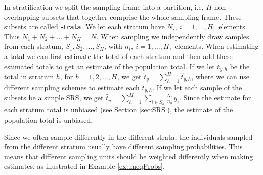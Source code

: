 \documentclass{article}
\begin{document}
In stratification we split the sampling frame into a partition, i.e, \(H\) non-
overlapping subsets that together comprise the whole sampling frame. These
subsets are called \textbf{strata}. We let each stratum have \(N_i,\ i = 1, \dots
, H,\) elements. Thus \(N_1 + N_2 + \dots + N_H = N\). When sampling we
independently draw samples from each stratum, \(S_1, S_2, \dots, S_H\), with \(n_i,\ i = 1, \dots
, H,\) elements. When
estimating a total we can first estimate the total of each stratum and
then add these estimated totals to get an estimate of the population total.
If we let \(t_{y,h}\) be the total in stratum \(h\), for \(h = 1, 2, \dots, H\), we get \(\hat{t}_y =
\sum_{h = 1}^H \hat{t}_{y, h} \), where we can use different sampling schemes to
estimate each \(t_{y, h}\).
If we let each sample of the subsets be a simple SRS, we get \( \hat{t}_y =
\sum_{h = 1}^H\sum_{i \in S_h}\frac{N_h}{n_h}y_i\).
Since the estimate for each
stratum total is unbiased (see Section \ref{sec:SRS}), the estimate of the population
total is unbiased.

Since we often sample differently in the different strata,
the individuals sampled from the different stratum usually have
different sampling probabilities. This means that different sampling units
should be weighted differently when making estimates, as illustrated in Example \ref{ex:uneqProbs}.
\end{document}
